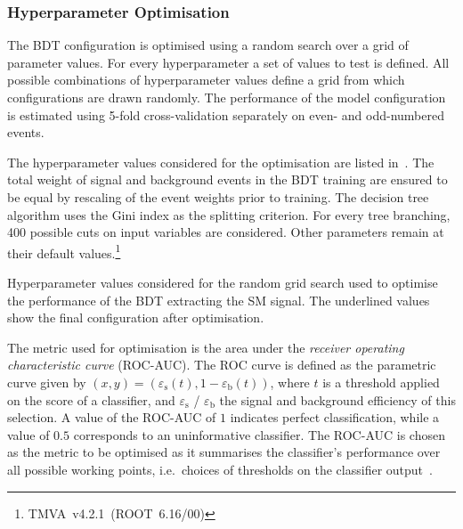 \subsubsection{Hyperparameter Optimisation}

The BDT configuration is optimised using a random search over a grid
of parameter values. For every hyperparameter a set of values to test
is defined. All possible combinations of hyperparameter values define
a grid from which configurations are drawn randomly. The performance
of the model configuration is estimated using 5-fold cross-validation
separately on even- and odd-numbered events.

The hyperparameter values considered for the optimisation are listed
in~. The total weight of signal and
background events in the BDT training are ensured to be equal by
rescaling of the event weights prior to training. The decision tree
algorithm uses the Gini index as the splitting criterion. For every
tree branching, 400 possible cuts on input variables are
considered. Other parameters remain at their default
values.\footnote{TMVA~v4.2.1~(ROOT~6.16/00)}

\begin{table}[htbp]
  \centering

  \caption{Hyperparameter values considered for the random grid search
    used to optimise the performance of the BDT extracting the SM \HH
    signal. The underlined values show the final configuration after
    optimisation.}%
  \label{tab:hyperparameter_grid_bdt}

  
\end{table}

The metric used for optimisation is the area under the \emph{receiver
  operating characteristic curve} (ROC-AUC). The ROC curve is defined
as the parametric curve given by
$(x, y) = \left( \varepsilon_{\text{s}}(t), 1 -
  \varepsilon_{\text{b}}(t) \right)$, where $t$ is a threshold applied
on the score of a classifier, and $\varepsilon_\text{s}$ /
$\varepsilon_\text{b}$ the signal and background efficiency of this
selection. A value of the ROC-AUC of $1$ indicates perfect
classification, while a value of $0.5$ corresponds to an uninformative
classifier. The ROC-AUC is chosen as the metric to be optimised as it
summarises the classifier's performance over all possible working
points, i.e.\ choices of thresholds on the classifier
output~\cite{james13}.

